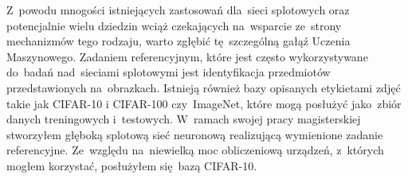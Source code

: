 \documentclass[oneside, 11pt, a4paper]{article}
\begin{document}
\begin{multicols}{2}
Z~powodu mnogości istniejących zastosowań dla~sieci splotowych oraz potencjalnie wielu dziedzin wciąż czekających na~wsparcie ze~strony mechanizmów tego rodzaju, warto zgłębić tę~szczególną gałąź Uczenia Maszynowego. Zadaniem referencyjnym, które jest często wykorzystywane do~badań nad~sieciami splotowymi jest identyfikacja przedmiotów przedstawionych na~obrazkach. Istnieją również bazy opisanych etykietami zdjęć takie jak CIFAR-10 i CIFAR-100\cite{cifar10and100} czy~ImageNet\cite{imagenet}, które mogą posłużyć jako~zbiór danych treningowych i~testowych. W~ramach swojej pracy magisterskiej stworzyłem głęboką splotową sieć neuronową realizującą wymienione zadanie referencyjne. Ze~względu na~niewielką moc obliczeniową urządzeń, z~których mogłem korzystać, posłużyłem się~bazą CIFAR-10.
\vfill

{}



\end{multicols}
\end{document}
